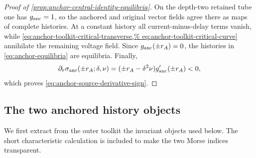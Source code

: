 \begin{proof}[Proof of
  \cref{prop:anchor-central-identity-equilibria}]
On the depth-two retained tube one has \(g_{\rm anc}=1\), so the anchored
and original vector fields agree there as maps of complete histories.  At a
constant history all current-minus-delay terms vanish, while
\cref{eq:anchor-toolkit-critical-transverse,%
eq:anchor-toolkit-critical-curve} annihilate the
remaining voltage field.  Since \(g_{\rm anc}(\pm r_A)=0\), the histories
in \cref{eq:anchor-equilibria} are equilibria.  Finally,
\[
 \partial_r\sigma_{\rm anc}(\pm r_A;\delta,\nu)
   =(\pm r_A-\delta^2\nu)g_{\rm anc}'(\pm r_A)<0,
\]
which proves \cref{eq:anchor-source-derivative-sign}.
\end{proof}

\subsection{The two anchored history objects}

We first extract from the outer toolkit the invariant objects used below.
The short characteristic calculation is included to make the two Morse
indices transparent.

